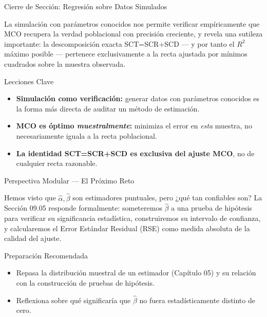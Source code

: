 \documentclass[10pt, aspectratio=169]{beamer}
\begin{document}
\begin{frame}{Cierre de Sección: Regresión sobre Datos Simulados}
  \begin{reflexion}
    La simulación con parámetros conocidos nos permite verificar empíricamente que MCO recupera la verdad poblacional con precisión creciente, y revela una sutileza importante: la descomposición exacta SCT=SCR+SCD --- y por tanto el $R^2$ máximo posible --- pertenece exclusivamente a la recta ajustada por mínimos cuadrados sobre la muestra observada.
  \end{reflexion}

  \vspace{0.2cm}
  \pause
  \begin{block}{Lecciones Clave}
    \begin{itemize}\itemsep=0.08cm
      \item \textbf{Simulación como verificación:} generar datos con parámetros conocidos es la forma más directa de auditar un método de estimación.
      \item \textbf{MCO es óptimo \emph{muestralmente}:} minimiza el error en \emph{esta} muestra, no necesariamente iguala a la recta poblacional.
      \item \textbf{La identidad SCT=SCR+SCD es exclusiva del ajuste MCO}, no de cualquier recta razonable.
    \end{itemize}
  \end{block}
\end{frame}

\begin{frame}{Perspectiva Modular --- El Próximo Reto}
  \scriptsize
  \begin{retoclase}
    Hemos visto que $\hat\alpha,\hat\beta$ son estimadores puntuales, pero ¿qué tan confiables son? La Sección 09.05 responde formalmente: someteremos $\hat\beta$ a una prueba de hipótesis para verificar su significancia estadística, construiremos su intervalo de confianza, y calcularemos el Error Estándar Residual (RSE) como medida absoluta de la calidad del ajuste.
  \end{retoclase}

  \vspace{0.08cm}
  \pause
  \begin{alertblock}{Preparación Recomendada}
    \begin{itemize}\itemsep=0.06cm
      \item Repasa la distribución muestral de un estimador (Capítulo 05) y su relación con la construcción de pruebas de hipótesis.
      \item Reflexiona sobre qué significaría que $\hat\beta$ no fuera estadísticamente distinto de cero.
    \end{itemize}
  \end{alertblock}
\end{frame}
\end{document}
